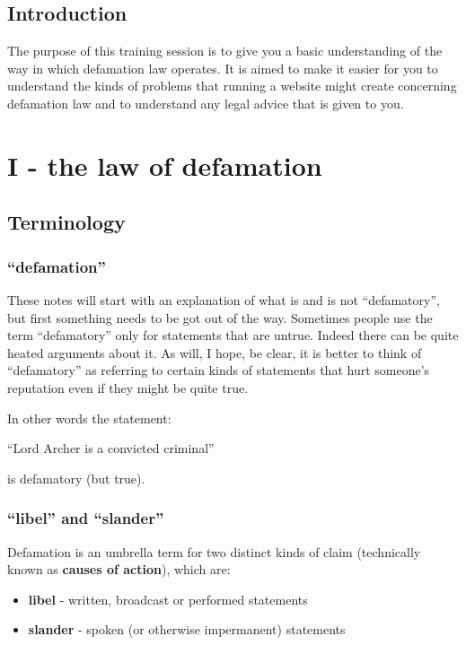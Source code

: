 \documentclass[]{article}
\date{}
\begin{document}
\subsection{Introduction}

The purpose of this training session is to give you a basic
understanding of the way in which defamation law operates. It is aimed
to make it easier for you to understand the kinds of problems that
running a website might create concerning defamation law and to
understand any legal advice that is given to you.

\section{I - the law of defamation}

\subsection{Terminology}

\subsubsection{\texorpdfstring{``defamation''}{defamation}}

These notes will start with an explanation of what is and is not ``defamatory'', but first something needs to be got out of the way. Sometimes people use the term ``defamatory'' only for statements that are untrue. Indeed there can be quite heated arguments about it. As will, I hope, be clear, it is better to think of ``defamatory'' as referring to certain kinds of statements that hurt someone's reputation even if they might be quite true. 

In other words the statement:

``Lord Archer is a convicted criminal''

is defamatory (but true).

\subsubsection{\texorpdfstring{``libel'' and
``slander''}{libel and slander}}

Defamation is an umbrella term for two distinct kinds of claim
(technically known as \textbf{causes of action}{), which are:}

\begin{itemize}
\item
  \textbf{libel}{ - written, broadcast or performed statements}
\item
  \textbf{slander}{ - spoken (or otherwise impermanent) statements}
\end{itemize}
\end{document}
